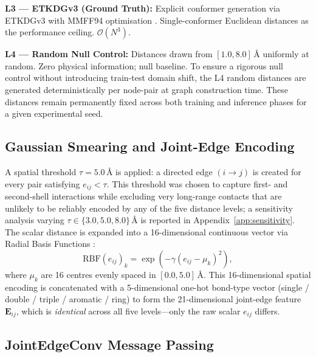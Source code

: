 \documentclass[pdflatex,sn-vancouver-num]{sn-jnl}%
\theoremstyle{thmstyleone}%
\theoremstyle{thmstyletwo}%
\theoremstyle{thmstylethree}%
\begin{document}
\textbf{L3 --- ETKDGv3 (Ground Truth):} Explicit conformer generation via
ETKDGv3 \cite{riniker2015etkdg} with MMFF94 optimisation \cite{tosco2014mmff}.
Single-conformer Euclidean distances as the performance ceiling.
$\mathcal{O}(N^3)$.

\textbf{L4 --- Random Null Control:} Distances drawn from $[1.0, 8.0]$\,\AA{}
uniformly at random. Zero physical information; null baseline. To ensure a rigorous null control without introducing train-test domain shift, the L4 random distances are generated deterministically per node-pair at graph construction time. These distances remain permanently fixed across both training and inference phases for a given experimental seed.

\subsection{Gaussian Smearing and Joint-Edge Encoding}

A spatial threshold $\tau = 5.0$\,\AA{} is applied: a directed edge
$(i \to j)$ is created for every pair satisfying $e_{ij} < \tau$.  This
threshold was chosen to capture first- and second-shell interactions while
excluding very long-range contacts that are unlikely to be reliably encoded
by any of the five distance levels; a sensitivity analysis varying $\tau \in
\{3.0, 5.0, 8.0\}$\,\AA{} is reported in Appendix~\ref{app:sensitivity}.
The scalar distance is expanded into a 16-dimensional continuous vector via
Radial Basis Functions \cite{schutt2018schnet}:
\begin{equation}
  \mathrm{RBF}(e_{ij})_k = \exp\!\left(-\gamma\left(e_{ij} - \mu_k\right)^2\right),
  \label{eq:rbf}
\end{equation}
where $\mu_k$ are 16 centres evenly spaced in $[0.0, 5.0]$\,\AA.
This 16-dimensional spatial encoding is concatenated with a 5-dimensional
one-hot bond-type vector (single / double / triple / aromatic / ring) to form
the 21-dimensional joint-edge feature $\mathbf{E}_{ij}$, which is
\emph{identical} across all five levels---only the raw scalar $e_{ij}$
differs.

\subsection{JointEdgeConv Message Passing}
\end{document}
